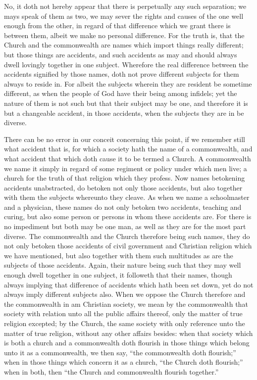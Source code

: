 No, it doth not hereby appear that there is perpetually  any such separation; we mays speak of them as two, we may sever the rights and causes of the one well enough from the other, in regard of that difference which we grant there is between them, albeit we make no personal difference. For the truth is, that the Church and the commonwealth are names which import things really different; but those things are accidents, and such accidents as may and should always dwell lovingly together in one subject. Wherefore the real difference between the accidents signified by those names, doth not prove different subjects for them always to reside in. For albeit the subjects wherein they are resident be sometime different, as when the people of God have their being among infidels; yet the nature of them is not such but that their subject may be one, and therefore it is but a changeable accident, in those accidents, when the subjects they are in be diverse.

There can be no error in our conceit concerning this point, if we remember still what accident that is, for which a society hath the name of a commonwealth, and what accident that which doth cause it to be termed a Church. A commonwealth we name it simply in regard of some regiment or policy under which men live; a church for the truth of that religion which they profess. Now names betokening accidents unabstracted, do betoken not only those accidents, but also together with them the subjects whereunto they cleave. As when we name a schoolmaster and a physician, these names do not only betoken two accidents, teaching and curing, but also some person or persons in whom these accidents are. For there is no impediment but both may be one man, as well as they are for the most part diverse. The commonwealth and the Church therefore being such names, they do not only betoken those accidents of civil government and Christian religion which we have mentioned, but also together with them such multitudes as are the subjects of those accidents. Again, their nature being such that they may well enough dwell together in one subject, it followeth  that their names, though always implying that difference of accidents which hath been set down, yet do not always imply different subjects also. When we oppose the Church therefore and the commonwealth in am Christian society, we mean by the commonwealth that society with relation unto all the public affairs thereof, only the matter of true religion excepted; by the Church, the same society with only reference unto the matter of true religion, without any other affairs besides: when that society which is both a church and a commonwealth doth flourish in those things which belong unto it as a commonwealth, we then say, “the commonwealth doth flourish;” when in those things which concern it as a church, “the Church doth flourish;” when in both, then “the Church and commonwealth flourish together.”

